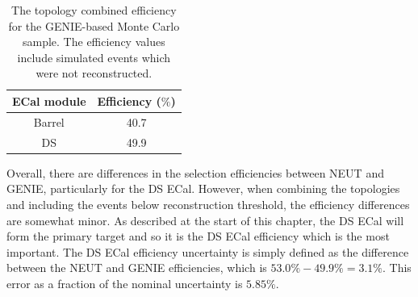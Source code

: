 \begin{table}
  \begin{tabular}{ c c }
    ECal module & Efficiency ($\%$) \\ \hline \hline
    Barrel & 40.7 \\
    DS & 49.9  \\
  \end{tabular}
  \caption{The topology combined efficiency for the GENIE-based Monte Carlo sample.  The efficiency values include simulated events which were not reconstructed.}
  \label{table:FinalEffGENIE}
\end{table}
\newline
\newline
Overall, there are differences in the selection efficiencies between NEUT and GENIE, particularly for the DS ECal.  However, when combining the topologies and including the events below reconstruction threshold, the efficiency differences are somewhat minor.  As described at the start of this chapter, the DS ECal will form the primary target and so it is the DS ECal efficiency which is the most important.  The DS ECal efficiency uncertainty is simply defined as the difference between the NEUT and GENIE efficiencies, which is $53.0\% - 49.9\% = 3.1\%$.  This error as a fraction of the nominal uncertainty is $5.85\%$.
